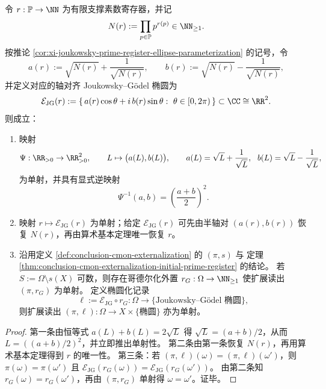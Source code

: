\begin{theorem}\label{thm:conclusion-jg-ellipse-arithmetic-invertibility-completeness}
令 \(r:\mathbb P\to\NN\) 为有限支撑素数寄存器，并记
\[
N(r):=\prod_{p\in\mathbb P}p^{r(p)}\in\NN_{\ge 1}.
\]
按推论 \ref{cor:xi-joukowsky-prime-register-ellipse-parameterization} 的记号，令
\[
a(r):=\sqrt{N(r)}+\frac{1}{\sqrt{N(r)}},
\qquad
b(r):=\sqrt{N(r)}-\frac{1}{\sqrt{N(r)}},
\]
并定义对应的轴对齐 Joukowsky--Gödel 椭圆为
\[
\mathcal{E}_{\mathrm{JG}}(r)
:=
\left\{\,a(r)\cos\theta+i\,b(r)\sin\theta:\ \theta\in[0,2\pi)\,\right\}
\subset\CC\cong\RR^2.
\]
则成立：
\begin{enumerate}
  \item 映射
  \[
  \Psi:\RR_{>0}\to\RR_{>0}^2,\qquad
  L\mapsto \bigl(a(L),b(L)\bigr),
  \qquad
  a(L)=\sqrt L+\frac{1}{\sqrt L},\ \ b(L)=\sqrt L-\frac{1}{\sqrt L},
  \]
  为单射，并具有显式逆映射
  \[
  \Psi^{-1}(a,b)=\left(\frac{a+b}{2}\right)^2.
  \]
  \item 映射 \(r\mapsto \mathcal{E}_{\mathrm{JG}}(r)\) 为单射；给定 \(\mathcal{E}_{\mathrm{JG}}(r)\) 可先由半轴对 \((a(r),b(r))\) 恢复 \(N(r)\)，再由算术基本定理唯一恢复 \(r\)。
  \item 沿用定义 \ref{def:conclusion-cmon-externalization} 的 \((\pi,s)\) 与
  定理 \ref{thm:conclusion-cmon-externalization-initial-prime-register} 的结论。
  若 \(S:=\Omega\setminus s(X)\) 可数，则存在哥德尔化外置
  \(r_G:\Omega\to\NN_{\ge 1}\) 使扩展读出 \((\pi,r_G)\) 为单射。
  定义椭圆化记录
  \[
  \ell:=\mathcal{E}_{\mathrm{JG}}\circ r_G:\Omega\to\{\text{Joukowsky--Gödel 椭圆}\},
  \]
  则扩展读出 \((\pi,\ell):\Omega\to X\times\{\text{椭圆}\}\) 亦为单射。
\end{enumerate}
\end{theorem}
\begin{proof}
第一条由恒等式 \(a(L)+b(L)=2\sqrt L\) 得 \(\sqrt L=(a+b)/2\)，从而 \(L=((a+b)/2)^2\)，并立即推出单射性。
第二条由第一条恢复 \(N(r)\)，再用算术基本定理得到 \(r\) 的唯一性。
第三条：若 \((\pi,\ell)(\omega)=(\pi,\ell)(\omega')\)，则 \(\pi(\omega)=\pi(\omega')\) 且 \(\mathcal{E}_{\mathrm{JG}}(r_G(\omega))=\mathcal{E}_{\mathrm{JG}}(r_G(\omega'))\)。
由第二条知 \(r_G(\omega)=r_G(\omega')\)，再由 \((\pi,r_G)\) 单射得 \(\omega=\omega'\)。证毕。
\end{proof}

